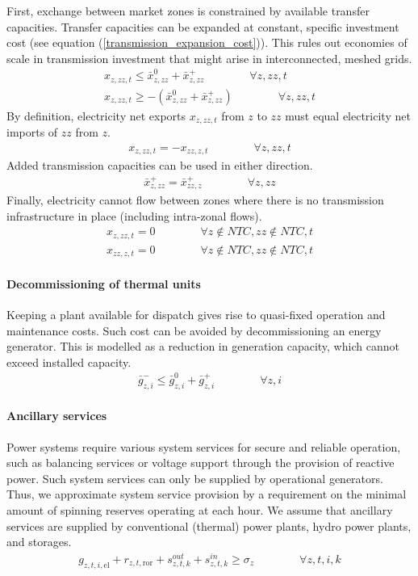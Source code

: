 \documentclass[11pt,a4paper]{article}
\begin{document}
First, exchange between market zones is constrained by available transfer capacities. Transfer capacities can be expanded at constant, specific investment cost (see equation (\ref{transmission_expansion_cost})). This rules out economies of scale in transmission investment that might arise in interconnected, meshed grids.
\begin{align}
x_{z,zz,t} \leq \bar{x}^{0}_{z,zz} + \bar{x}^{+}_{z,zz} \qquad \qquad \forall z, zz, t \\
x_{z,zz,t} \geq - \left( \bar{x}^{0}_{z,zz} + \bar{x}^{+}_{z,zz} \right) \qquad \qquad \forall z, zz, t
\end{align}
By definition, electricity net exports $x_{z,zz,t}$ from $z$ to $zz$ must equal electricity net imports of $zz$ from $z$.
\begin{align}
x_{z,zz,t} = -x_{zz,z,t} \qquad \qquad \forall z, zz, t
\end{align}
Added transmission capacities can be used in either direction.
\begin{align}
\bar{x}^{+}_{z,zz} = \bar{x}^{+}_{zz,z} \qquad \qquad \forall z, zz
\end{align}
Finally, electricity cannot flow between zones where there is no transmission infrastructure in place (including intra-zonal flows).
\begin{align}
x_{z,zz,t} = 0 \qquad \qquad \forall z \notin NTC, zz \notin NTC, t \\
x_{zz,z,t} = 0 \qquad \qquad \forall z \notin NTC, zz \notin NTC, t
\end{align}

\paragraph{Decommissioning of thermal units}
Keeping a plant available for dispatch gives rise to quasi-fixed operation and maintenance costs. 
Such cost can be avoided by decommissioning an energy generator. This is modelled as a reduction in generation capacity, which cannot exceed installed capacity.
\begin{align}
\bar{g}^{-}_{z,i} \leq \bar{g}^{0}_{z,i} + \bar{g}^{+}_{z,i} \qquad \qquad \forall z,i
\end{align}

\paragraph{Ancillary services}
Power systems require various system services for secure and reliable operation, such as balancing services or voltage support through the provision of reactive power. Such system services can only be supplied by operational generators. Thus, we approximate system service provision by a requirement on the minimal amount of spinning reserves operating at each hour. 
We assume that ancillary services are supplied by conventional (thermal) power plants, hydro power plants, and storages.
\begin{align}
g_{z,t,i,\text{el}} + r_{z,t,\text{ror}} + s^{out}_{z,t,k} + s^{in}_{z,t,k} \geq \sigma_{z} \qquad \qquad \forall z,t,i,k
\end{align}
\end{document}
